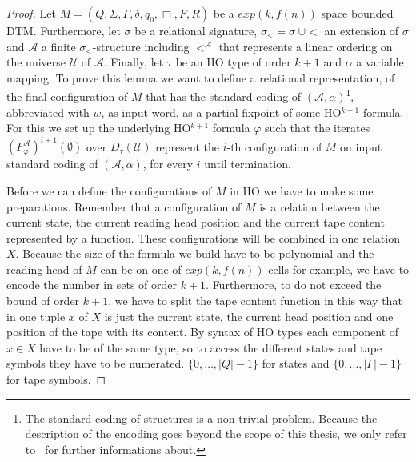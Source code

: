 \begin{proof}
    Let $M = (Q, \Sigma, \Gamma, \delta, q_0, \Box, F, R)$ be a $exp(k, f(n))$ space bounded DTM. Furthermore, let $\sigma$ be a relational signature, $\sigma_< = \sigma\;\cup
    <$ an extension of $\sigma$ and $\mathcal{A}$ a finite $\sigma_<$-structure including $<^\mathcal{A}$ that
    represents a linear ordering on the universe $\mathcal{U}$ of $\mathcal{A}$. Finally, let $\tau$ be an HO type of
    order $k + 1$ and $\alpha$ a variable mapping.
    To prove this lemma we want to define a relational representation, of the final configuration of $M$ that has the standard coding of $(\mathcal{A}, \alpha)$\footnote{The standard coding of structures is a non-trivial problem. Because the description of the encoding goes beyond the scope of this thesis, we only refer to~\cite{abiteboul1995computing} for further informations about.}, abbreviated with $w$, as input word,
    as a partial fixpoint of some HO$^{k+1}$ formula. For this we set up the underlying HO$^{k+1}$ formula
    $\varphi$ such that the iterates $(F_\varphi^\mathcal{A})^{i+1}(\emptyset)$ over $D_\tau
    (\mathcal{U})$ represent the $i$-th configuration of $M$ on input standard coding of $(\mathcal{A}, \alpha)$, for every $i$ until termination.

    Before we can define the configurations of $M$ in HO we have to make some preparations. Remember that a
    configuration of $M$ is a relation between the current state, the current reading head position and
    the current tape content represented by a function. These configurations will be combined in one relation $X$.
    Because the size of the formula we build have to be polynomial and the reading head of $M$ can be on
    one of $exp(k, f(n))$ cells for example, we have to encode the number in sets of order $k + 1$. Furthermore, to do
    not exceed the bound of order $k + 1$, we have to split the tape content function in this way that in one tuple
    $x$ of $X$ is just the current state, the current head position and one position of the tape with its content. By
    syntax of HO types each component of $x \in X$ have to be of the same type, so to access the different states and
    tape symbols they have to be numerated. $\{0, \dots, |Q| - 1\}$ for states and $\{0, \dots, |\Gamma| - 1\}$ for tape
    symbols.


\end{proof}
